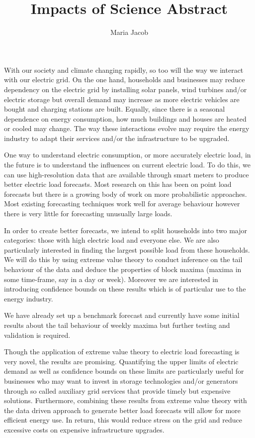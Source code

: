 \documentclass[a4paper]{article}
\title{Impacts of Science Abstract}
\author{Maria Jacob}
\begin{document}
\maketitle

With our society and climate changing rapidly, so too will the way we interact with our electric grid. On the one hand, households and businesses may reduce dependency on the electric grid by installing solar panels, wind turbines and/or electric storage but overall demand may increase as more electric vehicles are bought and charging stations are built. Equally, since there is a seasonal dependence on energy consumption, how much buildings and houses are heated or cooled may change. The way these interactions evolve may require the energy industry to adapt their services and/or the infrastructure to be upgraded.

One way to understand electric consumption, or more accurately electric load, in the future is to understand the influences on current electric load. To do this, we can use high-resolution data that are available through smart meters to produce better electric load forecasts. Most research on this has been on point load forecasts but there is a growing body of work on more probabilistic approaches. Most existing forecasting techniques work well for average behaviour however there is very little for forecasting unusually large loads.

In order to create better forecasts, we intend to split households into two major categories: those with high electric load and everyone else. We are also particularly interested in finding the largest possible load from these households. We will do this by using extreme value theory to conduct inference on the tail behaviour of the data and deduce the properties of block maxima (maxima in some time-frame, say in a day or week). Moreover we are interested in introducing confidence bounds on these results which is of particular use to the energy industry.

We have already set up a benchmark forecast and currently have some initial results about the tail behaviour of weekly maxima but further testing and validation is required.

Though the application of extreme value theory to electric load forecasting is very novel, the results are promising. Quantifying the upper limits of electric demand as well as confidence bounds on these limits are particularly useful for businesses who may want to invest in storage technologies and/or generators through so called auxiliary grid services that provide timely but expensive solutions. Furthermore, combining these results from extreme value theory with the data driven approach to generate better load forecasts will allow for more efficient energy use. In return, this would reduce stress on the grid and reduce excessive costs on expensive infrastructure upgrades.
\end{document}
